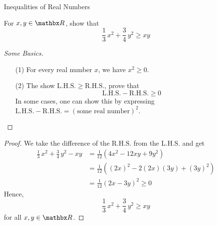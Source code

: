 \vspace*{2em}

\begin{mdframed}
\begin{center}
{\Large Inequalities of Real Numbers}
\end{center}
\end{mdframed}

\begin{example}\label{example:lec5}
For $x, y \in \rr$, show that
\[\frac{1}{3}\,x^2 + \frac{3}{4}\,y^2 \geq xy\]
\end{example}
\begin{proof}[Some Basics]\hfill
\renewcommand{\qed}{}
\begin{itemize}
\item[(1)] For every real number $x$, we have $x^2 \geq 0$.
\item[(2)] The show $\mathrm{L.H.S.} \geq \mathrm{R.H.S.}$, prove that
\[\mathrm{L.H.S.} - \mathrm{R.H.S.} \geq 0\]
In some cases, one can show this by expressing $\mathrm{L.H.S.} - \mathrm{R.H.S.} = (\text{some real number})^2$.
\end{itemize}
\end{proof}
\begin{proof}
We take the difference of the $\mathrm{R.H.S.}$ from the $\mathrm{L.H.S.}$ and get
\begin{align*}
\frac{1}{3}\,x^2 + \frac{3}{4}\,y^2 - xy &= \frac{1}{12}\left(4x^2 - 12xy + 9y^2\right)\\[0.5em]
 &= \frac{1}{12}\left((2x)^2 - 2(2x)(3y) + (3y)^2\right)\\[0.5em]
 &= \frac{1}{12}(2x - 3y)^2 \geq 0
\end{align*}
Hence,
\[\frac{1}{3}\,x^2 + \frac{3}{4}\,y^2 \geq xy\]
for all $x, y \in \rr$.
\end{proof}

\vspace*{1em}

